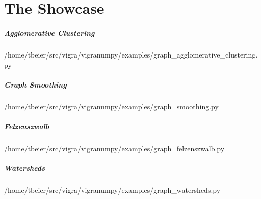 \flushleft
\chapter{The Showcase}\label{ch:the_showcase} 



\paragraph{Agglomerative Clustering}

{/home/tbeier/src/vigra/vigranumpy/examples/graph_agglomerative_clustering.py}


\paragraph{Graph Smoothing}

{/home/tbeier/src/vigra/vigranumpy/examples/graph_smoothing.py}

\paragraph{Felzenszwalb}

{/home/tbeier/src/vigra/vigranumpy/examples/graph_felzenszwalb.py}

\paragraph{Watersheds}

{/home/tbeier/src/vigra/vigranumpy/examples/graph_watersheds.py}